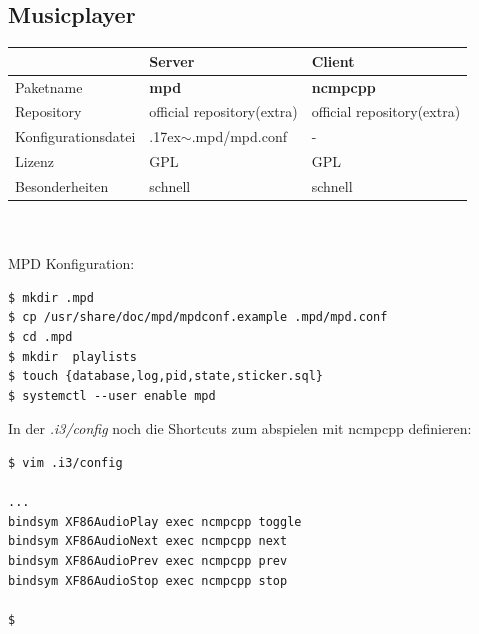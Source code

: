 \subsection{Musicplayer}
\begin{tabular}{l|l|l}
~ & Server & Client \\ \hline
Paketname & \textbf{mpd} & \textbf{ncmpcpp} \\ 
Repository & official repository(extra) & official repository(extra) \\
Konfigurationsdatei & {{\raise.17ex\hbox{$\scriptstyle\mathtt{\sim}$}}.mpd/mpd.conf} & - \\
Lizenz & GPL & GPL \\
Besonderheiten & schnell & schnell\\
\end{tabular}
\\ \\
MPD Konfiguration:
\begin{lstlisting}[style=Bash]
$ mkdir .mpd
$ cp /usr/share/doc/mpd/mpdconf.example .mpd/mpd.conf
$ cd .mpd
$ mkdir  playlists
$ touch {database,log,pid,state,sticker.sql}
$ systemctl --user enable mpd
\end{lstlisting}
In der \emph{.i3/config} noch die Shortcuts zum abspielen mit ncmpcpp definieren:
\begin{lstlisting}[style=Bash]
$ vim .i3/config

...
bindsym XF86AudioPlay exec ncmpcpp toggle
bindsym XF86AudioNext exec ncmpcpp next
bindsym XF86AudioPrev exec ncmpcpp prev
bindsym XF86AudioStop exec ncmpcpp stop

$
\end{lstlisting}

